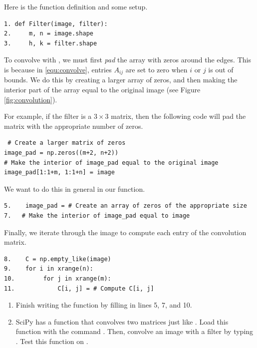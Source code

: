 Here is the function definition and some setup.
\begin{lstlisting}
1. def Filter(image, filter):
2.     m, n = image.shape
3.     h, k = filter.shape
\end{lstlisting}
To convolve  with , we must first \emph{pad} the array  with zeros around the edges.
This is because in \eqref{equ:convolve}, entries $A_{ij}$ are set to zero when $i$ or $j$ is out of bounds.
We do this by creating a larger array of zeros, and then making the interior part of the array equal to the original image (see Figure \ref{fig:convolution}).

For example, if the filter is a $3 \times 3$ matrix, then the following code will pad the matrix with the appropriate number of zeros.
\begin{lstlisting}
 # Create a larger matrix of zeros
image_pad = np.zeros((m+2, n+2))
# Make the interior of image_pad equal to the original image
image_pad[1:1+m, 1:1+n] = image
\end{lstlisting}
We want to do this in general in our function.
\begin{lstlisting}
5.    image_pad = # Create an array of zeros of the appropriate size
7.   # Make the interior of image_pad equal to image
\end{lstlisting}

Finally, we iterate through the image to compute each entry of the convolution matrix.
\begin{lstlisting}
8.    C = np.empty_like(image)
9.    for i in xrange(n):
10.        for j in xrange(m):
11.            C[i, j] = # Compute C[i, j]
\end{lstlisting}


\begin{problem}\label{prob:filter}
\leavevmode
\begin{enumerate}
\item Finish writing the function  by filling in lines 5, 7, and 10. 
\item SciPy has a function that convolves two matrices just like .
Load this function with the command . 
Then, convolve an image  with a filter  by typing .
Test this function on .
\end{enumerate}
\end{problem}

